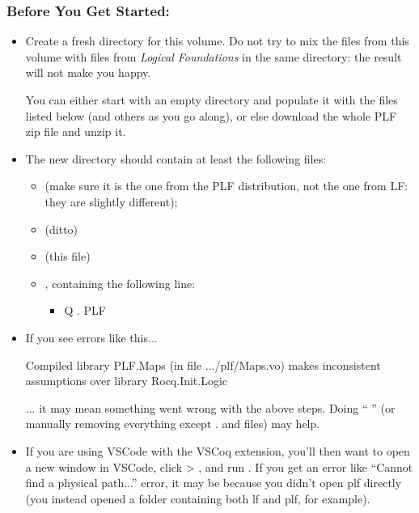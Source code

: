 \documentclass[12pt]{report}
\begin{document}
\subsubsection{Before You Get Started:}





\begin{itemize}
\item  Create a fresh directory for this volume. Do not try to mix the
      files from this volume with files from \textit{Logical Foundations} in
      the same directory: the result will not make you happy.


      You can either start with an empty directory and populate it
      with the files listed below (and others as you go along), or
      else download the whole PLF zip file and unzip it.



\item  The new directory should contain at least the following files:

\begin{itemize}
\item  {} (make sure it is the one from the PLF distribution,
           not the one from LF: they are slightly different);

\item  {} (ditto)

\item  {} (this file)

\item  {}, containing the following line:



\begin{itemize}
\item Q . PLF



\end{itemize}

\end{itemize}

\item  If you see errors like this...


           Compiled library PLF.Maps (in file .../plf/Maps.vo)
           makes inconsistent assumptions over library Rocq.Init.Logic


      ... it may mean something went wrong with the above steps.
      Doing `` '' (or manually removing everything except
      . and  files) may help.



\item  If you are using VSCode with the VSCoq extension, you'll then
      want to open a new window in VSCode, click   > ,
      and run .  If you get an error like ``Cannot find a
      physical path...'' error, it may be because you didn't open plf
      directly (you instead opened a folder containing both lf and
      plf, for example). 
\end{itemize}
\end{document}
